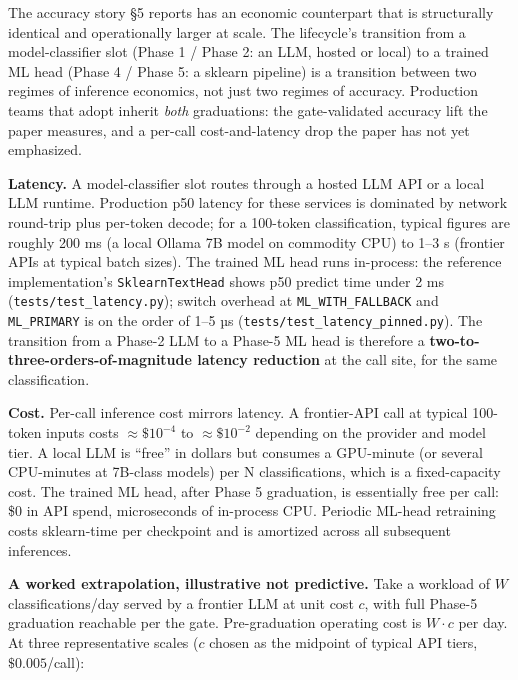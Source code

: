 The accuracy story §5 reports has an economic counterpart that is
structurally identical and operationally larger at scale. The
lifecycle's transition from a model-classifier slot (Phase 1 / Phase 2:
an LLM, hosted or local) to a trained ML head (Phase 4 / Phase 5: a
sklearn pipeline) is a transition between two regimes of inference
economics, not just two regimes of accuracy. Production teams that adopt
\sysname{} inherit \emph{both} graduations: the gate-validated accuracy
lift the paper measures, and a per-call cost-and-latency drop the paper
has not yet emphasized.

\textbf{Latency.} A model-classifier slot routes through a hosted LLM
API or a local LLM runtime. Production p50 latency for these services is
dominated by network round-trip plus per-token decode; for a 100-token
classification, typical figures are roughly 200 ms (a local Ollama 7B
model on commodity CPU) to 1--3 s (frontier APIs at typical batch
sizes). The trained ML head runs in-process: the reference
implementation's \texttt{SklearnTextHead} shows p50 predict time under 2
ms (\texttt{tests/test\_latency.py}); switch overhead at
\texttt{ML\_WITH\_FALLBACK} and \texttt{ML\_PRIMARY} is on the order of
1--5 µs (\texttt{tests/test\_latency\_pinned.py}). The transition from a
Phase-2 LLM to a Phase-5 ML head is therefore a
\textbf{two-to-three-orders-of-magnitude latency reduction} at the call
site, for the same classification.

\textbf{Cost.} Per-call inference cost mirrors latency. A frontier-API
call at typical 100-token inputs costs \(\approx \$10^{-4}\) to
\(\approx \$10^{-2}\) depending on the provider and model tier. A local
LLM is ``free'' in dollars but consumes a GPU-minute (or several
CPU-minutes at 7B-class models) per N classifications, which is a
fixed-capacity cost. The trained ML head, after Phase 5 graduation, is
essentially free per call: \$0 in API spend, microseconds of in-process
CPU. Periodic ML-head retraining costs sklearn-time per checkpoint and
is amortized across all subsequent inferences.

\textbf{A worked extrapolation, illustrative not predictive.} Take a
workload of \(W\) classifications/day served by a frontier LLM at unit
cost \(c\), with full Phase-5 graduation reachable per the gate.
Pre-graduation operating cost is \(W \cdot c\) per day. At three
representative scales (\(c\) chosen as the midpoint of typical API
tiers, \(\$0.005\)/call):

